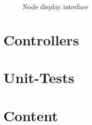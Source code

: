 \begin{figure}[htbp]
\begin{center}
\caption{Node display interface}
\label{fig:NyayaNodeDisplay}
\end{center}
\end{figure}

\section{Controllers}








\section{Unit-Tests}

\section{Content}



